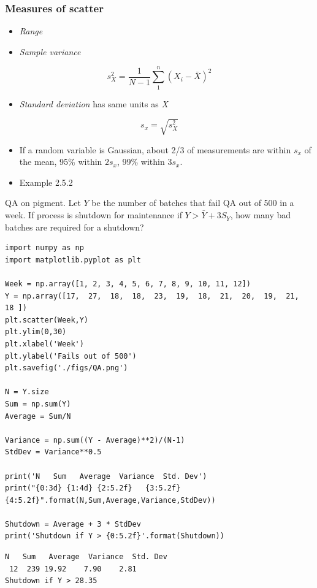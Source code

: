 \documentclass[11pt]{article}
\begin{document}
\subsubsection{Measures of scatter}
\label{sec-3-7-5}
\begin{itemize}
\item \emph{Range}
\item \emph{Sample variance}
\end{itemize}
\[\boxed{s_{X}^{2}=\frac{1}{N-1}\sum_{1}^{n}(X_{i}-\bar{X})^{2}}\]
\begin{itemize}
\item \emph{Standard deviation} has same units as \emph{X}
\end{itemize}
\[\boxed{s_{x}=\sqrt{s_{X}^{2}}} \]
\begin{itemize}
\item If a random variable is Gaussian, about 2/3 of measurements are within \(s_{x}\) of the mean, 95\% within \(2s_{x}\), 99\% within \(3s_{x}\).
\item Example 2.5.2
\end{itemize}

\begin{framed}
\noindent QA on pigment.  Let \(Y\) be the number of batches that fail QA out of 500 in a week.  If process is shutdown for maintenance if \(Y > \bar{Y} + 3 S_{Y}\), how many bad batches are required for a shutdown?
\end{framed}

\begin{verbatim}
import numpy as np
import matplotlib.pyplot as plt

Week = np.array([1, 2, 3, 4, 5, 6, 7, 8, 9, 10, 11, 12])
Y = np.array([17,  27,  18,  18,  23,  19,  18,  21,  20,  19,  21,  18 ])
plt.scatter(Week,Y)
plt.ylim(0,30)
plt.xlabel('Week')
plt.ylabel('Fails out of 500')
plt.savefig('./figs/QA.png')

N = Y.size
Sum = np.sum(Y)
Average = Sum/N

Variance = np.sum((Y - Average)**2)/(N-1)
StdDev = Variance**0.5

print('N   Sum   Average  Variance  Std. Dev')
print("{0:3d} {1:4d} {2:5.2f}   {3:5.2f}   {4:5.2f}".format(N,Sum,Average,Variance,StdDev))

Shutdown = Average + 3 * StdDev
print('Shutdown if Y > {0:5.2f}'.format(Shutdown))
\end{verbatim}

\begin{verbatim}
N   Sum   Average  Variance  Std. Dev
 12  239 19.92    7.90    2.81
Shutdown if Y > 28.35
\end{verbatim}
\end{document}
